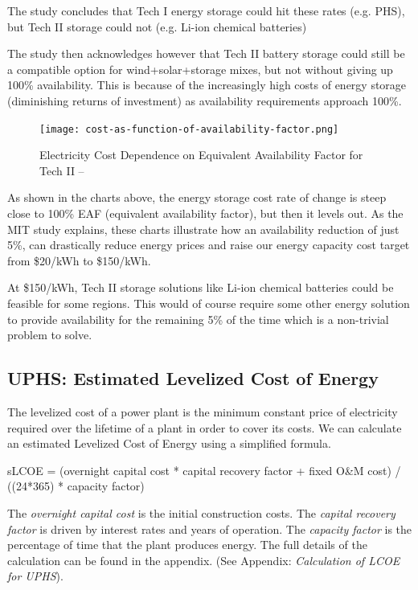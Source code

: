 \documentclass[hidelinks,12pt,a4paper]{article}
\begin{document}
The study concludes that Tech I energy storage could hit these rates (e.g. PHS), but Tech II storage could not (e.g. Li-ion chemical batteries)

The study then acknowledges however that Tech II battery storage could still be a compatible option for wind+solar+storage mixes, but not without giving up 100\% availability. This is because of the increasingly high costs of energy storage (diminishing returns of investment) as availability requirements approach 100\%.

\begin{figure}[ht!]
    \centering
    \texttt{[image: cost-as-function-of-availability-factor.png]}
    \caption{Electricity Cost Dependence on Equivalent Availability Factor for Tech II -- \cite{StorageRequirementsAndCostsOfShapingRenewableEnergy}}
\end{figure}
\FloatBarrier

As shown in the charts above, the energy storage cost rate of change is steep close to 100\% EAF (equivalent availability factor), but then it levels out. As the MIT study explains, these charts illustrate how an availability reduction of just 5\%, can drastically reduce energy prices and raise our energy capacity cost target from \$20/kWh to \$150/kWh.

At \$150/kWh, Tech II storage solutions like Li-ion chemical batteries could be feasible for some regions. This would of course require some other energy solution to provide availability for the remaining 5\% of the time which is a non-trivial problem to solve.

\subsection{UPHS: Estimated Levelized Cost of Energy}
The levelized cost of a power plant is the minimum constant price of electricity required over the lifetime of a plant in order to cover its costs. We can calculate an estimated Levelized Cost of Energy using a simplified formula.

\begin{displayquote}
sLCOE = (overnight capital cost * capital recovery factor + fixed O\&M cost) / ((24*365) * capacity factor) \cite{SimpleLevelizedCostOfEnergyCalculator}
\end{displayquote}

The \textit{overnight capital cost} is the initial construction costs. The \textit{capital recovery factor} is driven by interest rates and years of operation. The \textit{capacity factor} is the percentage of time that the plant produces energy. The full details of the calculation can be found in the appendix. (See Appendix: \textit{Calculation of LCOE for UPHS}).
\end{document}
